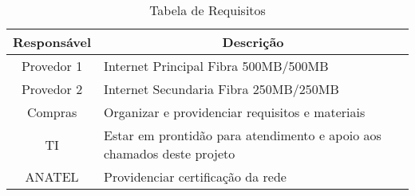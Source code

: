 \begin{table}[h!] %
	\centering
	\caption{Tabela de Requisitos}
	\label{tabRequisitos} %
	\begin{tabular}{|c|l|}
		\hline
		\textbf{Responsável} & \multicolumn{1}{c|}{\textbf{Descrição}}                                \\ \hline
		Provedor 1           & Internet Principal Fibra 500MB/500MB                                   \\ \hline
		Provedor 2           & Internet Secundaria Fibra 250MB/250MB                                  \\ \hline
		Compras              & Organizar e providenciar requisitos e materiais                        \\ \hline
		TI                   & Estar em prontidão para atendimento e apoio aos chamados deste projeto \\ \hline
		ANATEL               & Providenciar certificação da rede                                      \\ \hline
	\end{tabular}
\end{table}
